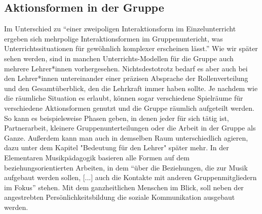 \subsection{Aktionsformen in der Gruppe}
Im Unterschied zu \enquote{einer zweipoligen Interaktionsform im
Einzelunterricht ergeben sich mehrpolige Interaktionsformen im Gruppenuntericht,
was Unterrichtssituationen für gewöhnlich komplexer erscheinen lässt.}
\autocite[30]{losert:die_kunst_zu_unterrichten} Wie wir später sehen werden,
sind in manchen Unterrichts-Modellen für die Gruppe auch mehrere Lehrer*innen
vorhergesehen. Nichtsdestotrotz bedarf es aber auch bei den Lehrer*innen
untereinander einer präzisen Absprache der Rollenverteilung und den
Gesamtüberblick, den die Lehrkraft immer haben sollte. Je nachdem wie die
räumliche Situation es erlaubt, können sogar verschiedene Spielräume für
verschiedene Aktionsformen genutzt und die Gruppe räumlich aufgeteilt werden. So
kann es beispielsweise Phasen geben, in denen jeder für sich tätig ist,
Partnerarbeit, kleinere Gruppenunterteilungen oder die Arbeit in der Gruppe als
Ganze. Außerdem kann man auch in demselben Raum unterschiedlich agieren, dazu
unter dem Kapitel "Bedeutung für den Lehrer" später mehr. In der Elementaren
Musikpädagogik basieren alle Formen auf dem beziehungsorientierten Arbeiten, in
dem \enquote{über die Beziehungen, die zur Musik aufgebaut werden sollen, [...]
auch die Kontakte mit anderen Gruppenmitgliedern im Fokus}
\autocite[10]{dartsch:kern_des_musizierens} stehen. Mit dem ganzheitlichen
Menschen im Blick, soll neben der angestrebten Persönlichkeitsbildung die
soziale Kommunikation ausgebaut werden.
